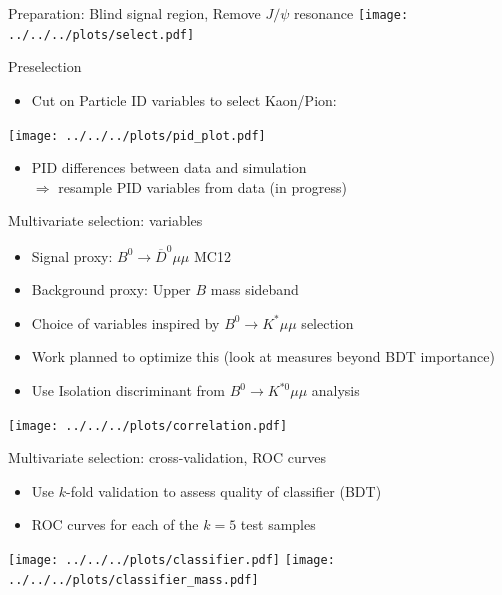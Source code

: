 \documentclass[compress,aspectratio=43]{beamer}
\begin{document}
\begin{frame}{Preparation: Blind signal region, Remove $J/\psi$ resonance}
  \centering
  \texttt{[image: ../../../plots/select.pdf]}
\end{frame}

\begin{frame}{Preselection}
  \begin{itemize}
    \item {\small Cut on Particle ID variables to select Kaon/Pion:}
  \end{itemize}
  \centering
  \texttt{[image: ../../../plots/pid\_plot.pdf]}
  \begin{itemize}
    \item PID differences between data and simulation\\
      $\Rightarrow$ resample PID variables from data (in progress)
  \end{itemize}
\end{frame}

\begin{frame}[shrink=20]{Multivariate selection: variables}
  \begin{itemize}
    \item Signal proxy: $B^0\to \overline{D}^0\mu\mu$ MC12
    \item Background proxy: Upper $B$ mass sideband
    \item Choice of variables inspired by $B^0\to K^*\mu\mu$ selection
    \item Work planned to optimize this (look at measures beyond BDT importance)
    \item Use Isolation discriminant from $B^0\to K^{*0}\mu\mu$ analysis
  \end{itemize}
  \centering
  \texttt{[image: ../../../plots/correlation.pdf]}
\end{frame}

\begin{frame}[shrink=20]{Multivariate selection: cross-validation, ROC curves}
  \begin{itemize}
    \item Use $k$-fold validation to assess quality of classifier (BDT)
    \item ROC curves for each of the $k=5$ test samples
  \end{itemize}
  \centering
  \texttt{[image: ../../../plots/classifier.pdf]}
  \texttt{[image: ../../../plots/classifier\_mass.pdf]}
\end{frame}
\end{document}
